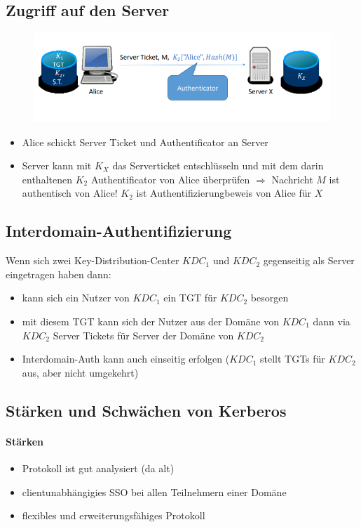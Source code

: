 \subsection{Zugriff auf den Server}
\begin{figure}[H]
	\begin{center}
		\includegraphics[scale=0.8]{Resources/KerberosZugriff.png}
		\caption{}
		\label{fig:KerberosZugriff.png}
	\end{center}
\end{figure}
\begin{itemize}
	\item Alice schickt Server Ticket und Authentificator an Server
	\item Server kann mit $K_X$ das Serverticket entschlüsseln und mit dem darin enthaltenen $K_2$ Authentificator von Alice überprüfen $\Rightarrow$ Nachricht $M$ ist authentisch von Alice!
	$K_2$ ist Authentifizierungbeweis von Alice für $X$ 
\end{itemize}

\subsection{Interdomain-Authentifizierung}
Wenn sich zwei Key-Distribution-Center $KDC_1$ und $KDC_2$ gegenseitig als Server eingetragen haben dann:
\begin{itemize}
	\item kann sich ein Nutzer von $KDC_1$ ein TGT für $KDC_2$ besorgen
	\item mit diesem TGT kann sich der Nutzer aus der Domäne von $KDC_1$ dann via $KDC_2$ Server Tickets für Server der Domäne von $KDC_2$ 
	\item Interdomain-Auth kann auch einseitig erfolgen ($KDC_1$ stellt TGTs für $KDC_2$ aus, aber nicht umgekehrt)
\end{itemize}

\subsection{Stärken und Schwächen von Kerberos}
\paragraph{Stärken}
\begin{itemize}
	\item Protokoll ist gut analysiert (da alt)
	\item clientunabhängigies SSO bei allen Teilnehmern einer Domäne
	\item flexibles und erweiterungsfähiges Protokoll
\end{itemize}


